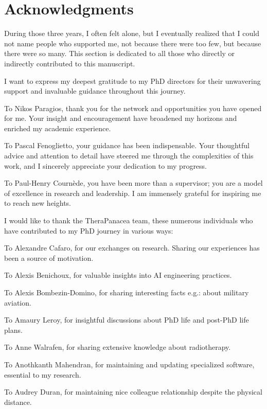 \chapter*{Acknowledgments}
During those three years, I often felt alone, but I eventually realized that I could not name people who supported me, not because there were too few, but because there were so many.
This section is dedicated to all those who directly or indirectly contributed to this manuscript.



I want to express my deepest gratitude to my PhD directors for their unwavering support and invaluable guidance throughout this journey.

To Nikos Paragios, thank you for the network and opportunities you have opened for me.
Your insight and encouragement have broadened my horizons and enriched my academic experience.

To Pascal Fenoglietto, your guidance has been indispensable.
Your thoughtful advice and attention to detail have steered me through the complexities of this work, and I sincerely appreciate your dedication to my progress.

To Paul-Henry Cournède, you have been more than a supervisor; you are a model of excellence in research and leadership.
I am immensely grateful for inspiring me to reach new heights.



I would like to thank the TheraPanacea team, these numerous individuals who have contributed to my PhD journey in various ways:

To Alexandre Cafaro, for our exchanges on research.
Sharing our experiences has been a source of motivation.

To Alexis Benichoux, for valuable insights into AI engineering practices.

To Alexis Bombezin-Domino, for sharing interesting facts e.g.: about military aviation.

To Amaury Leroy, for insightful discussions about PhD life and post-PhD life plans.

To Anne Walrafen, for sharing extensive knowledge about radiotherapy.

To Anothkanth Mahendran, for maintaining and updating specialized software, essential to my research.

To Audrey Duran, for maintaining nice colleague relationship despite the physical distance.

